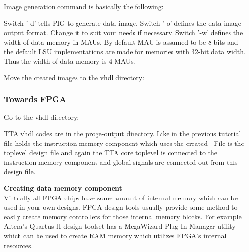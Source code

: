 \documentclass[twoside]{tceusermanual}
\begin{document}
Image generation command is basically the following:


Switch '-d' tells PIG to generate data image. Switch '-o' defines the data
image output format. Change it to suit your needs if necessary. Switch '-w'
defines the width of data memory in MAUs. By default MAU is assumed to be 8
bits and the default LSU implementations are made for memories with 32-bit
data width. Thus the width of data memory is 4 MAUs.

Move the created images to the vhdl directory:



\subsubsection{Towards FPGA}
Go to the vhdl directory:


TTA vhdl codes are in the proge-output directory. Like in the previous
tutorial file  holds the instruction memory
component which uses the created . File
 is the toplevel design file and again the
TTA core toplevel is connected to the instruction memory component and global
signals are connected out from this design file.

\textbf{Creating data memory component} \\
Virtually all FPGA chips have some amount of internal memory which can be used
in your own designs. FPGA design tools usually provide some method to easily
create memory controllers for those internal memory blocks. For example
Altera's Quartus II design toolset has a MegaWizard Plug-In Manager utility
which can be used to create RAM memory which utilizes FPGA's internal
resources.
\end{document}
